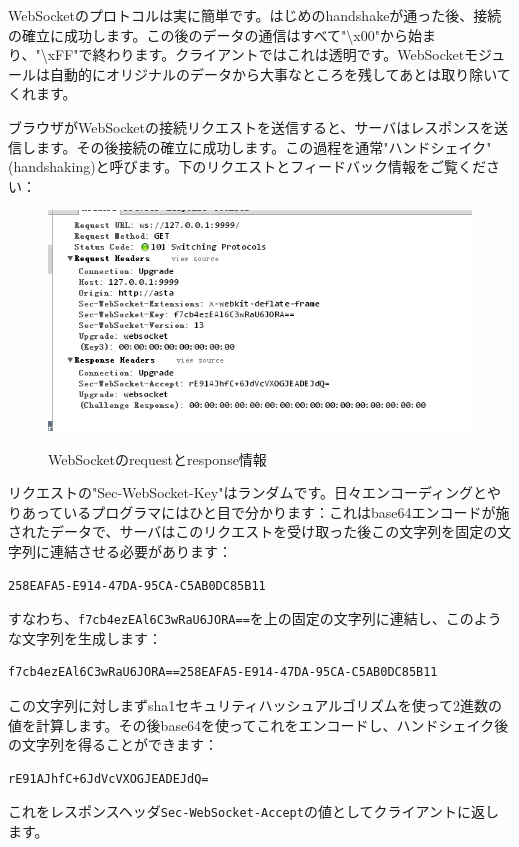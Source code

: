 WebSocketのプロトコルは実に簡単です。はじめのhandshakeが通った後、接続の確立に成功します。この後のデータの通信はすべて"\textbackslash x00"から始まり、"\textbackslash xFF"で終わります。クライアントではこれは透明です。WebSocketモジュールは自動的にオリジナルのデータから大事なところを残してあとは取り除いてくれます。

ブラウザがWebSocketの接続リクエストを送信すると、サーバはレスポンスを送信します。その後接続の確立に成功します。この過程を通常"ハンドシェイク"(handshaking)と呼びます。下のリクエストとフィードバック情報をご覧ください：

\begin{figure}[H]
  \includegraphics[width=14cm]{8.2.websocket2.png}
  \label{図8.3}
   \caption{WebSocketのrequestとresponse情報}
\end{figure}

リクエストの"Sec-WebSocket-Key"はランダムです。日々エンコーディングとやりあっているプログラマにはひと目で分かります：これはbase64エンコードが施されたデータで、サーバはこのリクエストを受け取った後この文字列を固定の文字列に連結させる必要があります：


\begin{lstlisting}[numbers=none]
258EAFA5-E914-47DA-95CA-C5AB0DC85B11
\end{lstlisting}

すなわち、\texttt{f7cb4ezEAl6C3wRaU6JORA==}を上の固定の文字列に連結し、このような文字列を生成します：

\begin{lstlisting}[numbers=none]
f7cb4ezEAl6C3wRaU6JORA==258EAFA5-E914-47DA-95CA-C5AB0DC85B11
\end{lstlisting}

この文字列に対しまずsha1セキュリティハッシュアルゴリズムを使って2進数の値を計算します。その後base64を使ってこれをエンコードし、ハンドシェイク後の文字列を得ることができます：



\begin{lstlisting}[numbers=none]
rE91AJhfC+6JdVcVXOGJEADEJdQ=
\end{lstlisting}

これをレスポンスヘッダ\texttt{Sec-WebSocket-Accept}の値としてクライアントに返します。




